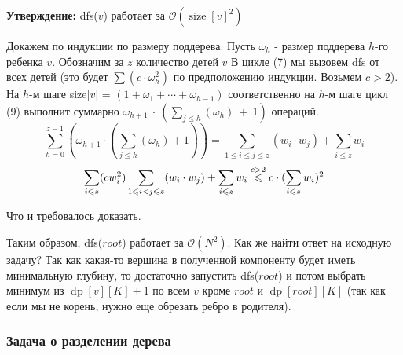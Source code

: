 \documentclass[a4paper,12pt]{article}
\begin{document}
      \textbf{Утверждение:} dfs($v$) работает за 
      $\mathcal{O}(\operatorname{size}[v]^2)$ 

      Докажем по индукции по размеру поддерева. Пусть $\omega_h$ - 
      размер поддерева $h$-го ребенка $v$. Обозначим за $z$ количество 
      детей $v$ В цикле (7) мы вызовем dfs от всех детей (это 
      будет $\sum(c \cdot \omega_h^2)$ по предположению индукции. 
      Возьмем $c > 2$). На $h$-м шаге size[$v$] = 
       $(1 + \omega_1 + \cdots + \omega_{h - 1})$ соответственно на 
       $h$-м шаге цикл (9) выполнит суммарно 
       $\omega_{h + 1}~\cdot~(\sum\limits_{j \leqslant h}(\omega_h)~+~1)$ 
       операций. $$\sum\limits_{h = 0}^{z - 1}(\omega_{h + 1} \cdot 
       (\sum\limits_{j \leqslant h}(\omega_h) + 1)) = \sum\limits_{1 \leqslant i 
       \leqslant j \leqslant z}(w_i \cdot w_j) + \sum_{i \leqslant z}w_i $$
       $$\sum_{i \leqslant z} (c w_i^2) \sum\limits_{1 \leqslant i < j 
       \leqslant z}(w_i \cdot w_j) + \sum_{i \leqslant z}w_i \buildrel 
       c > 2 \over \leqslant c \cdot (\sum\limits_{i \leqslant z} 
       w_i) ^ 2$$

       Что и требовалось доказать.
       
       Таким образом, dfs($root$) работает за $\mathcal{O}(N^2)$. 
       Как же найти ответ на исходную задачу? Так как какая-то вершина в 
       полученной компоненту будет иметь минимальную глубину, то достаточно 
       запустить dfs($root$) и потом выбрать минимум из 
       $\operatorname{dp}[v][K] + 1$ по всем $v$ кроме $root$ и 
       $\operatorname{dp}[root][K]$ (так как если мы не корень, нужно еще 
       обрезать ребро в родителя).

      \subsubsection{Задача о разделении дерева}
\end{document}
